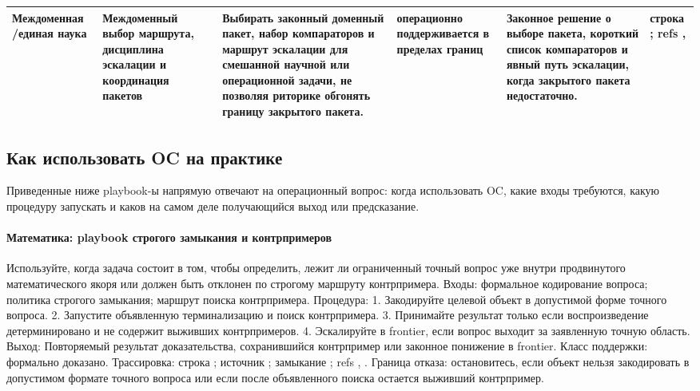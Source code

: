 \begin{longtable}{@{}L{0.11\textwidth}L{0.16\textwidth}L{0.19\textwidth}L{0.12\textwidth}L{0.18\textwidth}L{0.16\textwidth}@{}}
Междоменная /\allowbreak единая наука & Междоменный выбор маршрута, дисциплина эскалации и координация пакетов & Выбирать законный доменный пакет, набор компараторов и маршрут эскалации для смешанной научной или операционной задачи, не позволяя риторике обгонять границу закрытого пакета. & операционно поддерживается в пределах границ & Законное решение о выборе пакета, короткий список компараторов и явный путь эскалации, когда закрытого пакета недостаточно. & строка ; \allowbreak refs , \allowbreak {} \\
\bottomrule
\end{longtable}
\endgroup

\subsection{Как использовать OC на практике}
Приведенные ниже playbook-ы напрямую отвечают на операционный вопрос: когда использовать OC, какие входы требуются, какую процедуру запускать и каков на самом деле получающийся выход или предсказание.

\paragraph{Математика: playbook строгого замыкания и контрпримеров}
Используйте, когда задача состоит в том, чтобы определить, лежит ли ограниченный точный вопрос уже внутри продвинутого математического якоря или должен быть отклонен по строгому маршруту контрпримера.
Входы: формальное кодирование вопроса; \allowbreak политика строгого замыкания; \allowbreak маршрут поиска контрпримера.
Процедура: 1. Закодируйте целевой объект в допустимой форме точного вопроса. 2. Запустите объявленную терминализацию и поиск контрпримера. 3. Принимайте результат только если воспроизведение детерминировано и не содержит выживших контрпримеров. 4. Эскалируйте в frontier, если вопрос выходит за заявленную точную область.
Выход: Повторяемый результат доказательства, сохранившийся контрпример или законное понижение в frontier.
Класс поддержки: формально доказано.
Трассировка: строка ; \allowbreak источник ; \allowbreak замыкание ; \allowbreak refs , \allowbreak {}.
Граница отказа: остановитесь, если объект нельзя закодировать в допустимом формате точного вопроса или если после объявленного поиска остается выживший контрпример.

